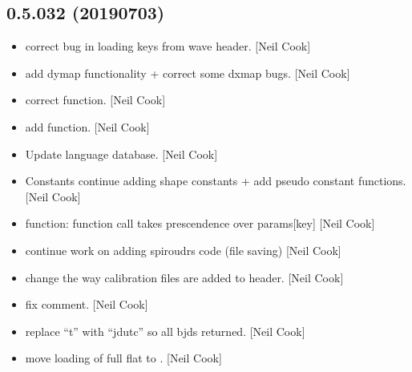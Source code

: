\documentclass[a4paper,10pt,english]{report}
\begin{document}
\subsection{0.5.032 (2019\sphinxhyphen{}07\sphinxhyphen{}03)}
\label{\detokenize{misc/changelog:id126}}\begin{itemize}
\item {} 
 \sphinxhyphen{} correct bug in loading keys from wave header.
{[}Neil Cook{]}

\item {} 
 \sphinxhyphen{} add dymap functionality + correct some dxmap
bugs. {[}Neil Cook{]}

\item {} 
 \sphinxhyphen{} correct  function.
{[}Neil Cook{]}

\item {} 
 \sphinxhyphen{} add  function. {[}Neil
Cook{]}

\item {} 
Update language database. {[}Neil Cook{]}

\item {} 
Constants \sphinxhyphen{} continue adding shape constants + add pseudo constant
functions. {[}Neil Cook{]}

\item {} 
 \sphinxhyphen{}  function: function call takes prescendence
over params{[}key{]} {[}Neil Cook{]}

\item {} 
 \sphinxhyphen{} continue work on adding spiroudrs code
(file saving) {[}Neil Cook{]}

\item {} 
 \sphinxhyphen{} change the way calibration files are added to
header. {[}Neil Cook{]}

\item {} 
 \sphinxhyphen{} fix comment. {[}Neil Cook{]}

\item {} 
 \sphinxhyphen{} replace “t” with “jdutc” so all bjds returned. {[}Neil
Cook{]}

\item {} 
 \sphinxhyphen{} move loading of full flat to
. {[}Neil Cook{]}


\end{itemize}
\end{document}
